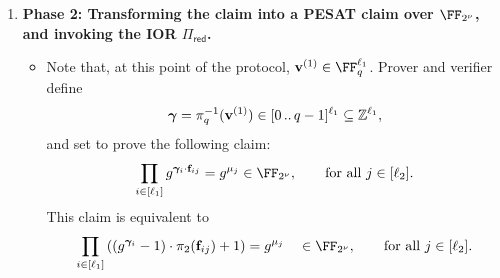 \documentclass[11pt,letterpaper,usenames,dvipsnames]{article}
\begin{document}
\begin{construction}
\begin{enumerate}[leftmargin=*]
\begin{itemize}[leftmargin=*]
In \cref{s:proof_size_opt} we describe a variation in which, instead of sending the elements $\mu_1, \ldots, \mu_{\codedim_2}$, the prover commits to their bit-decomposition over $\comfield$, and proves \eqref{e:tensor_decomposition_reconstruction} the present IOR. This saves on proof size and verifier time when $\codedim$ is large.
\item \textbf{Optional step: Projecting the integer claim to a prime field, and then lifting it back up to $\ZZ$.} The following step triggers in the following scenarios:
\begin{itemize}
    \item $\degevalfield>0$.
    \item $\degevalfield=0$ and $q\geq |\comfield|-1$. 
\end{itemize} The verifier uniformly samples and sends a  prime $q'$ from $\cP$, and, if $\degevalfield>0$,  an element $\alpha\in \FF_{q'}$. Now update 
%
\begin{align*}
\vv^{(1)}{} &\gets \pi_{q',\alpha}\circ \picanon^{-1}\left(\vv^{(1)}\right)\in \FF_{q'},\\
\mu_j &\gets \pi_{q'}^{-1}\circ \pi_{q',\alpha}(\mu_j) \in \range{0}{q'-1}\subseteq \ZZ, \qquad j\in [\codedim_2],\\
q&\gets q'.
\end{align*}
\end{itemize}
%
\item \textbf{Phase 2: Transforming the claim into a PESAT claim over {$\comfield$}, and invoking the IOR {$\Pi_{\mathsf{red}}$}.}
\begin{itemize}[leftmargin=*]
\item Note that, at this point of the protocol, $\vv^{(1)}\in \FF_q^{\codedim_1}$. 
Prover and verifier define $$\bm{\gamma} = \pi_{q}^{-1}(\mathbf{v}^{(1)}) \in [0 \, .. \, q-1]^{\ell_1}\subseteq \mathbb{Z}^{\ell_1},$$ and set to prove the following claim:
%
$$
\prod_{i \in [\codedim_1]} g^{\bm{\gamma}_i\cdot \bff_{ij}}  = g^{\mu_j} \in \comfield, \qquad \text{for all } j\in [\codedim_2].
$$
This claim is equivalent to
$$
\prod_{i \in [\codedim_1]} \left(\left(g^{\bm{\gamma}_i}-1\right)\cdot \pi_2(\bff_{ij}) +1\right)= g^{\mu_j}  \quad  \in \comfield, \qquad \text{for all } j\in [\codedim_2].
$$
\end{itemize}
\end{enumerate}
\end{construction}
\end{document}
